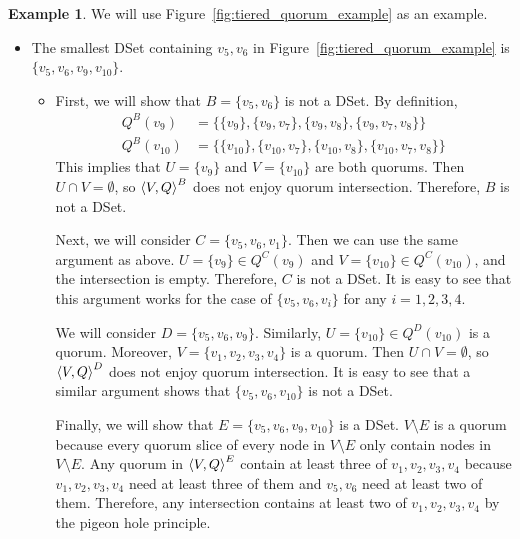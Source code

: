 \documentclass[12pt, psamsfonts]{amsart}
\theoremstyle{definition}
\newtheorem{exmp}[thm]{Example}
\theoremstyle{remark}
\numberwithin{equation}{section}
\begin{document}
\begin{exmp}
    We will use Figure~\ref{fig:tiered_quorum_example} as an example.

    \begin{itemize}
        \item
            The smallest DSet containing $v_5, v_6$ in Figure~\ref{fig:tiered_quorum_example} is $\{ v_5, v_6, v_9, v_{10} \}$.
            \begin{itemize}
                \item
                    First, we will show that $B = \{ v_5, v_6 \}$ is not a DSet.
                    By definition,
                    \begin{align*}
                        Q^B(v_9) &= \{ \{ v_9 \}, \{ v_9, v_7 \}, \{ v_9, v_8 \}, \{ v_9, v_7, v_8 \} \} \\
                        Q^B(v_{10}) &= \{ \{ v_{10} \}, \{ v_{10}, v_7 \}, \{ v_{10}, v_8 \}, \{ v_{10}, v_7, v_8 \} \}
                    \end{align*}
                    This implies that $U = \{ v_9 \}$ and $V = \{ v_{10} \}$ are both quorums.
                    Then $U \cap V = \emptyset$, so $\ev{V, Q}^B$ does not enjoy quorum intersection.
                    Therefore, $B$ is not a DSet.

                    Next, we will consider $C = \{ v_5, v_6, v_1 \}$.
                    Then we can use the same argument as above.
                    $U = \{ v_9 \} \in Q^C(v_9)$ and $V = \{ v_{10} \} \in Q^C(v_{10})$, and the intersection is empty.
                    Therefore, $C$ is not a DSet.
                    It is easy to see that this argument works for the case of $\{ v_5, v_6, v_i \}$ for any $i = 1, 2, 3, 4$.

                    We will consider $D = \{ v_5, v_6, v_9 \}$.
                    Similarly, $U = \{ v_{10} \} \in Q^D(v_{10})$ is a quorum.
                    Moreover, $V = \{ v_1, v_2, v_3, v_4 \}$ is a quorum.
                    Then $U \cap V = \emptyset$, so $\ev{V, Q}^D$ does not enjoy quorum intersection.
                    It is easy to see that a similar argument shows that $\{ v_5, v_6, v_{10} \}$ is not a DSet.

                    Finally, we will show that $E = \{ v_5, v_6, v_9, v_{10} \}$ is a DSet.
                    $V \setminus E$ is a quorum because every quorum slice of every node in $V \setminus E$ only contain nodes in $V \setminus E$.
                    Any quorum in $\ev{V, Q}^E$ contain at least three of $v_1, v_2, v_3, v_4$ because $v_1, v_2, v_3, v_4$ need at least three of them and $v_5, v_6$ need at least two of them.
                    Therefore, any intersection contains at least two of $v_1, v_2, v_3, v_4$ by the pigeon hole principle.


\end{itemize}
\end{itemize}
\end{exmp}
\end{document}
